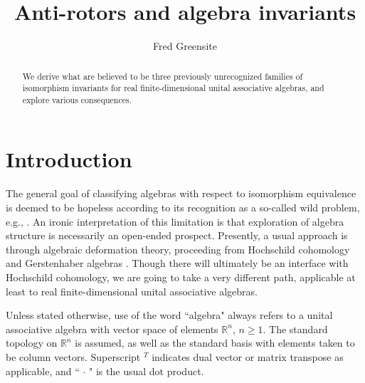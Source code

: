 \documentclass{amsart}
\numberwithin{equation}{section}
\theoremstyle{definition}
\numberwithin{theorem}{section}
\begin{document}
    
    
    
    \title{Anti-rotors and algebra invariants}
    
       \author{Fred Greensite}
 
       \begin{abstract} We derive what are believed to be three previously unrecognized families of isomorphism invariants for real finite-dimensional unital associative algebras, and explore various consequences. 
   \end{abstract}
   
    \maketitle
    

\section{Introduction}
The general goal of classifying algebras with respect to isomorphism equivalence is deemed to be hopeless according to its recognition as a so-called wild problem, e.g., \cite{eom:2024,drozd:1972,belitskii:2005}.  An ironic interpretation of this limitation is that exploration of algebra structure is necessarily an open-ended prospect.  
Presently, a usual approach is through algebraic deformation theory, proceeding from Hochschild \mbox{cohomology} and Gerstenhaber algebras \cite{hochschild:1945,gerstenhaber:1964}.  Though there will ultimately be an interface with Hochschild cohomology, we are going to take a very different path, applicable at least to real finite-dimensional unital associative algebras.  



Unless stated otherwise, use of the word ``algebra" always refers to a unital associative algebra with vector space of elements $\mathbb{R}^n$, $n\ge 1$.  The standard topology on $\mathbb{R}^n$ is assumed, as well as the standard basis with elements taken to be column vectors.  Superscript $^T$ indicates dual vector or matrix transpose as applicable, and ``$\,\cdot\,$" is the usual dot product.
\end{document}
